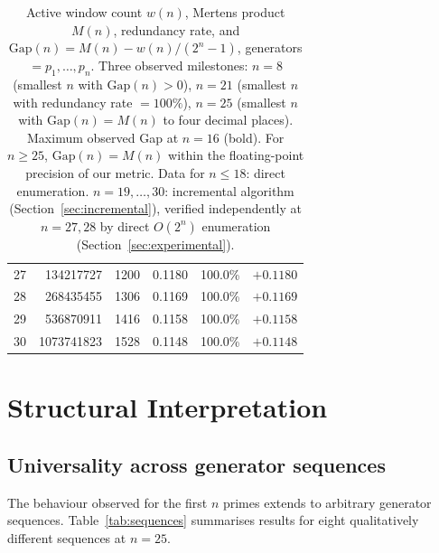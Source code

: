 \documentclass[11pt,a4paper]{amsart}
\theoremstyle{plain}
\theoremstyle{definition}
\theoremstyle{remark}
\begin{document}
\begin{table}[H]
\begin{tabular}{r|rrrrr}
27 &  134217727 & 1200 & 0.1180 &100.0\% & $+0.1180$ \\
28 &  268435455 & 1306 & 0.1169 &100.0\% & $+0.1169$ \\
29 &  536870911 & 1416 & 0.1158 &100.0\% & $+0.1158$ \\
30 & 1073741823 & 1528 & 0.1148 &100.0\% & $+0.1148$ \\
\hline
\end{tabular}
\caption{Active window count $w(n)$, Mertens product $M(n)$,
redundancy rate, and $\mathrm{Gap}(n) = M(n) - w(n)/(2^n-1)$,
generators $= p_1,\ldots,p_n$.
Three observed milestones: $n=8$ (smallest $n$ with $\mathrm{Gap}(n) > 0$),
$n=21$ (smallest $n$ with redundancy rate $= 100\%$),
$n=25$ (smallest $n$ with $\mathrm{Gap}(n) = M(n)$ to four decimal places).
Maximum observed Gap at $n=16$ (bold). For $n \geq 25$, $\mathrm{Gap}(n) = M(n)$
within the floating-point precision of our metric.
Data for $n \leq 18$: direct enumeration.
$n = 19,\ldots,30$: incremental algorithm (Section~\ref{sec:incremental}),
verified independently at $n=27,28$ by direct $O(2^n)$ enumeration
(Section~\ref{sec:experimental}).}
\label{tab:mertens}
\end{table}

\section{Structural Interpretation}
\label{sec:interpretation}

\subsection{Universality across generator sequences}

The behaviour observed for the first $n$ primes extends to arbitrary
generator sequences. Table~\ref{tab:sequences} summarises results for
eight qualitatively different sequences at $n = 25$.
\end{document}
